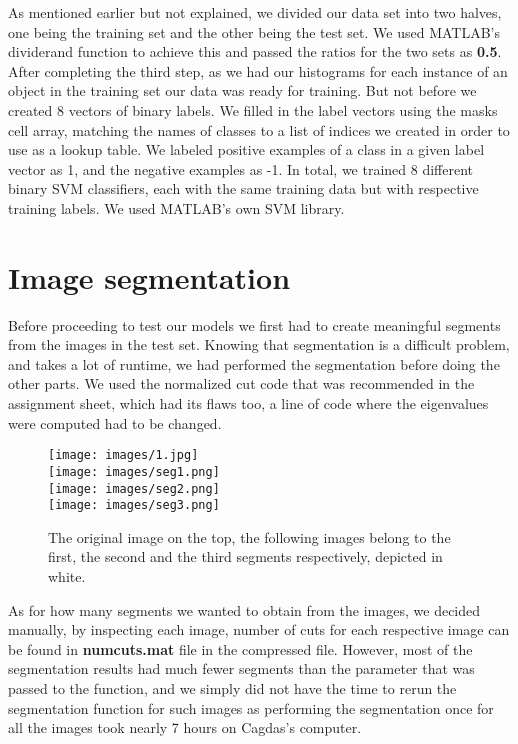 \documentclass[conference]{IEEEtran}
\newcommand{\fifthsection}{Image segmentation}
\begin{document}
As mentioned earlier but not explained, we divided our data set into two halves, one being the training set and the other being the test set. We used MATLAB's dividerand\cite{dividerand} function to achieve this and passed the ratios for the two sets as \textbf{0.5}. After completing the third step, as we had our histograms for each instance of an object in the training set our data was ready for training. But not before we created 8 vectors of binary labels. We filled in the label vectors using the masks cell array, matching the names of classes to a list of indices we created in order to use as a lookup table. We labeled positive examples of a class in a given label vector as 1, and the negative examples as -1. In total, we trained 8 different binary SVM classifiers, each with the same training data but with respective training labels. We used MATLAB's own SVM library\cite{matlab-svm}.

\section{\fifthsection}

Before proceeding to test our models we first had to create meaningful segments from the images in the test set. Knowing that segmentation is a difficult problem, and takes a lot of runtime, we had performed the segmentation before doing the other parts. We used the normalized cut code that was recommended in the assignment sheet\cite{ncut}, which had its flaws too, a line of code where the eigenvalues were computed had to be changed.

\begin{figure}[!h]
    \centering
    \texttt{[image: images/1.jpg]} \\
    \texttt{[image: images/seg1.png]} \\
    \texttt{[image: images/seg2.png]} \\
    \texttt{[image: images/seg3.png]} \\
    \caption{The original image on the top, the following images belong to the first, the second and the third segments respectively, depicted in white.}
    \label{fig:my_label}
\end{figure}

As for how many segments we wanted to obtain from the images, we decided manually, by inspecting each image, number of cuts for each respective image can be found in \textbf{numcuts.mat} file in the compressed file. However, most of the segmentation results had much fewer segments than the parameter that was passed to the function, and we simply did not have the time to rerun the segmentation function for such images as performing the segmentation once for all the images took nearly 7 hours on Cagdas's computer. 
\end{document}
